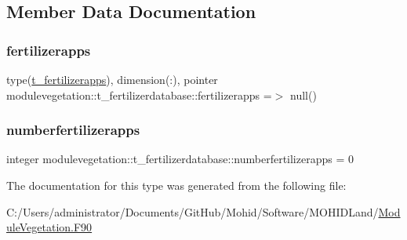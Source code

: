 \subsection{Member Data Documentation}
\mbox{\label{structmodulevegetation_1_1t__fertilizerdatabase_ae9da9ce377922153707c4079d7c9685c}} 
\subsubsection{\texorpdfstring{fertilizerapps}{fertilizerapps}}
{\footnotesize\ttfamily type(\mbox{\hyperlink{structmodulevegetation_1_1t__fertilizerapps}{t\+\_\+fertilizerapps}}), dimension(\+:), pointer modulevegetation\+::t\+\_\+fertilizerdatabase\+::fertilizerapps =$>$ null()\hspace{0.3cm}{\ttfamily [private]}}

\mbox{\label{structmodulevegetation_1_1t__fertilizerdatabase_ac45f33e0b8919722c9a05b92956a3ed5}} 
\subsubsection{\texorpdfstring{numberfertilizerapps}{numberfertilizerapps}}
{\footnotesize\ttfamily integer modulevegetation\+::t\+\_\+fertilizerdatabase\+::numberfertilizerapps = 0\hspace{0.3cm}{\ttfamily [private]}}



The documentation for this type was generated from the following file\+:\begin{DoxyCompactItemize}
\item 
C\+:/\+Users/administrator/\+Documents/\+Git\+Hub/\+Mohid/\+Software/\+M\+O\+H\+I\+D\+Land/\mbox{\hyperlink{_module_vegetation_8_f90}{Module\+Vegetation.\+F90}}\end{DoxyCompactItemize}
